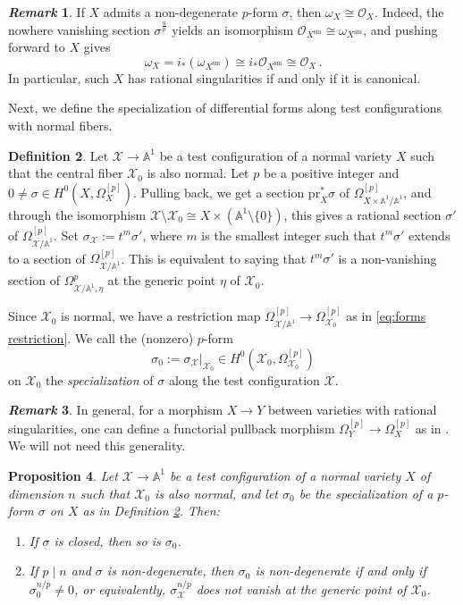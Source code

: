 \documentclass[12pt]{amsart}
\newtheorem{prop}{Proposition}[section]
\theoremstyle{definition}
\newtheorem{defn}[prop]{Definition}
\newtheorem{rem}[prop]{\it Remark}
\newcommand{\bA}{\mathbb{A}}
\newcommand{\cO}{\mathcal{O}}
\newcommand{\scX}{\mathscr{X}}
\numberwithin{equation}{section}
\begin{document}
\begin{rem}\label{rem:trivial-canonical}
If $X$ admits a non-degenerate $p$-form $\sigma$, then $\omega_X\cong \cO_X$. Indeed, the nowhere vanishing section $\sigma^{\frac{n}{p}}$ yields an isomorphism $\cO_{X^{\mathrm{sm}}}\cong \omega_{X^{\mathrm{sm}}}$, and pushing forward to $X$ gives
\[
\omega_X = i_*(\omega_{X^{\mathrm{sm}}}) \cong i_*\cO_{X^{\mathrm{sm}}} \cong \cO_X \, .
\]
In particular, such $X$ has rational singularities if and only if it is canonical.
\end{rem}

Next, we define the specialization of differential forms along test configurations with normal fibers.

\begin{defn}\label{def:degeneration of form}
Let $\scX\to \bA^1$ be a test configuration of a normal variety $X$ such that the central fiber $\scX_0$ is also normal. Let $p$ be a positive integer and $0\neq \sigma\in H^0(X,\Omega^{[p]}_X)$. Pulling back, we get a section $\mathrm{pr}_X^*\sigma$ of $\Omega^{[p]}_{X\times \bA^1 /\bA^1}$, and through the isomorphism $\scX\setminus \scX_0 \cong X\times (\bA^1\setminus \{0\})$, this gives a rational section $\sigma'$ of $\Omega^{[p]}_{\scX/\bA^1}$. Set $\sigma_{\scX}:=t^m \sigma'$, where $m$ is the smallest integer such that $t^m \sigma'$ extends to a section of $\Omega^{[p]}_{\scX/\bA^1}$. This is equivalent to saying that $t^m \sigma'$ is a non-vanishing section of $\Omega^{p}_{\scX/\bA^1,\eta}$ at the generic point $\eta$ of $\scX_0$.

Since $\scX_0$ is normal, we have a restriction map $\Omega^{[p]}_{\scX/\bA^1}\to \Omega^{[p]}_{\scX_0}$ as in \eqref{eq:forms restriction}. We call the (nonzero) $p$-form 
\[
\sigma_0:=\sigma_{\scX}|_{\scX_0}\in H^0(\scX_0,\Omega^{[p]}_{\scX_0})
\]
on $\scX_0$ the \emph{specialization} of $\sigma$ along the test configuration $\scX$.
\end{defn}

\begin{rem}
In general, for a morphism $X\to Y$ between varieties with rational singularities, one can define a functorial  pullback morphism
$\Omega^{[p]}_Y \to \Omega^{[p]}_X$ as in \cite{KS-extend-forms}. We will not need this generality. 
\end{rem}

\begin{prop}\label{prop:closed+non-deg}
Let $\scX\to \bA^1$ be a test configuration of a normal variety $X$ of dimension $n$ such that $\scX_0$ is also normal, and let $\sigma_0$ be the specialization of a $p$-form $\sigma$ on $X$ as in Definition \ref{def:degeneration of form}. Then:
\begin{enumerate}
\item If $\sigma$ is closed, then so is $\sigma_0$.
\item If $p\mid n$ and $\sigma$ is non-degenerate, then $\sigma_0$ is non-degenerate if and only if $\sigma_0^{n/p} \neq 0$, or equivalently, $\sigma_{\scX}^{n/p}$ does not vanish at the generic point of $\scX_0$.
\end{enumerate}
\end{prop}
\end{document}
